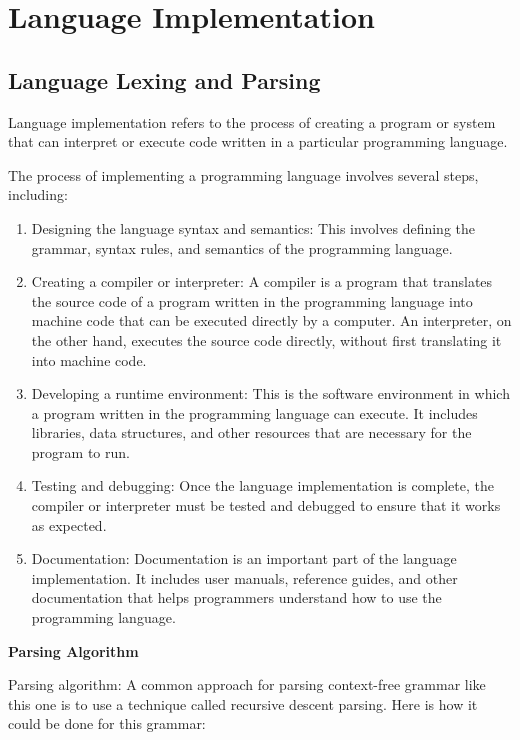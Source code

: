 \chapter{Language Implementation}

\section{Language Lexing and Parsing}

Language implementation refers to the process of creating a program or system that can interpret or execute code written in a particular programming language.

The process of implementing a programming language involves several steps, including:

\begin{enumerate}
    \item Designing the language syntax and semantics: This involves defining the grammar, syntax rules, and semantics of the programming language.
    \item Creating a compiler or interpreter: A compiler is a program that translates the source code of a program written in the programming language into machine code that can be executed directly by a computer. An interpreter, on the other hand, executes the source code directly, without first translating it into machine code.
    \item Developing a runtime environment: This is the software environment in which a program written in the programming language can execute. It includes libraries, data structures, and other resources that are necessary for the program to run.
    \item Testing and debugging: Once the language implementation is complete, the compiler or interpreter must be tested and debugged to ensure that it works as expected.
    \item Documentation: Documentation is an important part of the language implementation. It includes user manuals, reference guides, and other documentation that helps programmers understand how to use the programming language.
\end{enumerate}

\vspace{1em}

\textbf{Parsing Algorithm}

Parsing algorithm: 
A common approach for parsing context-free grammar like this one is to use a technique called recursive descent parsing. Here is how it could be done for this grammar:

